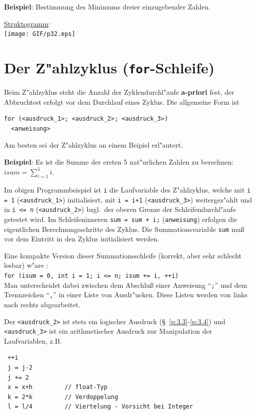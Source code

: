 \pagebreak
\textbf{Beispiel}: Bestimmung des Minimums
dreier einzugebender Zahlen.

\underline{Struktogramm}: \\%
\texttt{[image: GIF/p32.eps]}
%
%
%
%
\section[Der Z"ahlzyklus]{Der Z"ahlzyklus (\texttt{for}-Schleife)}
\label{p:4.4}
%
Beim Z"ahlzyklus steht die Anzahl der Zyklendurchl"aufe
\textbf{a-priori} fest, der Abbruchtest erfolgt vor dem Durchlauf eines Zyklus.
Die allgemeine Form ist

\mbox{}\hfill
\begin{minipage}[t]{0.8\textwidth}
\begin{verbatim}
for (<ausdruck_1>; <ausdruck_2>; <ausdruck_3>)
  <anweisung>
\end{verbatim}
\end{minipage}
\hfill\mbox{}
Am besten sei der Z"ahlzyklus an einem Beipiel erl"autert.

\textbf{Beispiel}: Es ist die Summe der ersten 5 nat"urlichen
Zahlen zu berechnen: $\displaystyle isum = \sum_{i=1}^{5} i$.
%

Im obigen Programmbeispiel ist \verb|i| die
Laufvariable des Z"ahlzyklus,
welche mit \verb|i = 1| (\verb|<ausdruck_1>|) initialisiert, mit
\verb|i = i+1| (\verb|<ausdruck_3>|) weitergez"ahlt und in
\verb|i <= n| (\verb|<ausdruck_2>|) bzgl.\  der
oberen Grenze der Schleifendurchl"aufe getestet wird.
Im Schleifeninneren \verb|sum = sum + i;| (\verb|anweisung|) erfolgen die
eigentlichen Berechnungsschritte des Zyklus. Die  Summationsvariable
\verb|sum| {mu\ss} vor dem Eintritt in den Zyklus initialisiert werden.

Eine kompakte Version dieser Summationsschleife
(korrekt, aber sehr schlecht lesbar) w"are :
\\
\verb|for (isum = 0, int i = 1; i <= n; isum += i, ++i)|
\\
Man unterscheidet dabei zwischen dem Abschlu{\ss} einer Anweisung ``\verb|;|''
und dem Trennzeichen ``\verb|,|'' in einer Liste von Ausdr"ucken.
Diese Listen werden von links nach rechts abgearbeitet.

Der \verb|<ausdruck_2>| ist stets ein logischer Ausdruck
(\S~\ref{p:3.3}-\ref{p:3.4}) und \verb|<ausdruck_3>|
ist ein arithmetischer Ausdruck zur Manipulation der Laufvariablen,
z.B.\\[1ex]
\begin{minipage} {0.9\textwidth}
\begin{verbatim}
 ++i
 j = j-2
 j += 2
 x = x+h         // float-Typ
 k = 2*k         // Verdoppelung
 l = l/4         // Viertelung - Vorsicht bei Integer
\end{verbatim}
\end{minipage}

